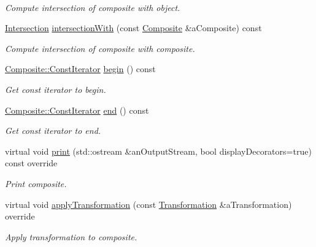 \begin{DoxyCompactItemize}
$$\begin{DoxyCompactList}\small\item\em Compute intersection of composite with object. \end{DoxyCompactList}\item 
\hyperlink{classostk_1_1math_1_1geom_1_1d3_1_1_intersection}{Intersection} \hyperlink{classostk_1_1math_1_1geom_1_1d3_1_1objects_1_1_composite_a4f5650ad091ee2009dd7b4cd135993bf}{intersection\+With} (const \hyperlink{classostk_1_1math_1_1geom_1_1d3_1_1objects_1_1_composite}{Composite} \&a\+Composite) const
\begin{DoxyCompactList}\small\item\em Compute intersection of composite with composite. \end{DoxyCompactList}\item 
\hyperlink{classostk_1_1math_1_1geom_1_1d3_1_1objects_1_1_composite_ab1f78408fec2e435dc1172cf2675b0a9}{Composite\+::\+Const\+Iterator} \hyperlink{classostk_1_1math_1_1geom_1_1d3_1_1objects_1_1_composite_ab94b6cd4186515bdc1fa246756fec3cb}{begin} () const
\begin{DoxyCompactList}\small\item\em Get const iterator to begin. \end{DoxyCompactList}\item 
\hyperlink{classostk_1_1math_1_1geom_1_1d3_1_1objects_1_1_composite_ab1f78408fec2e435dc1172cf2675b0a9}{Composite\+::\+Const\+Iterator} \hyperlink{classostk_1_1math_1_1geom_1_1d3_1_1objects_1_1_composite_abaaf231b9d0b5924ceb2b89db38cfe25}{end} () const
\begin{DoxyCompactList}\small\item\em Get const iterator to end. \end{DoxyCompactList}\item 
virtual void \hyperlink{classostk_1_1math_1_1geom_1_1d3_1_1objects_1_1_composite_afa4ff037d2ab625c650ef0e45c6ea4e6}{print} (std\+::ostream \&an\+Output\+Stream, bool display\+Decorators=true) const override
\begin{DoxyCompactList}\small\item\em Print composite. \end{DoxyCompactList}\item 
virtual void \hyperlink{classostk_1_1math_1_1geom_1_1d3_1_1objects_1_1_composite_a2d99d6b4096c2f5ba3175f886e2e2c7d}{apply\+Transformation} (const \hyperlink{classostk_1_1math_1_1geom_1_1d3_1_1_transformation}{Transformation} \&a\+Transformation) override
\begin{DoxyCompactList}\small\item\em Apply transformation to composite. \end{DoxyCompactList}\end{DoxyCompactItemize}
